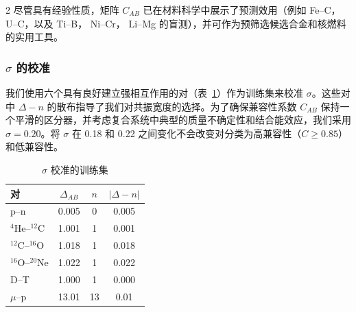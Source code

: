 \documentclass[11pt,a4paper]{article}
\begin{document}
\begin{multicols}{2}
		尽管具有经验性质，矩阵 \(C_{AB}\) 已在材料科学中展示了预测效用（例如 Fe–C， U–C，以及 Ti–B， Ni–Cr， Li–Mg 的盲测），并可作为预筛选候选合金和核燃料的实用工具。
		
		\subsubsection{\(\sigma\) 的校准}
		
		我们使用六个具有良好建立强相互作用的对（表~\ref{tab:calibration}）作为训练集来校准 \(\sigma\)。这些对中 \(\Delta - n\) 的散布指导了我们对共振宽度的选择。为了确保兼容性系数 \(C_{AB}\) 保持一个平滑的区分器，并考虑复合系统中典型的质量不确定性和结合能效应，我们采用 \(\sigma = 0.20\)。将 \(\sigma\) 在 0.18 和 0.22 之间变化不会改变对分类为高兼容性（\(C \ge 0.85\)）和低兼容性。
		
		\begin{table}[H]
			\centering
			\caption{\(\sigma\) 校准的训练集}
			\label{tab:calibration}
			\small
			\begin{tabular}{l c c c}
				\toprule
				对 & \(\Delta_{AB}\) & \(n\) & \(|\Delta - n|\) \\
				\midrule
				p--n    & 0.005 & 0 & 0.005 \\
				\(^4\)He--\(^{12}\)C & 1.001 & 1 & 0.001 \\
				\(^{12}\)C--\(^{16}\)O & 1.018 & 1 & 0.018 \\
				\(^{16}\)O--\(^{20}\)Ne & 1.022 & 1 & 0.022 \\
				D--T    & 1.000 & 1 & 0.000 \\
				\(\mu\)--p & 13.01 & 13 & 0.01 \\
				\bottomrule
			\end{tabular}
		\end{table}
		
	\end{multicols}
	
\end{document}
